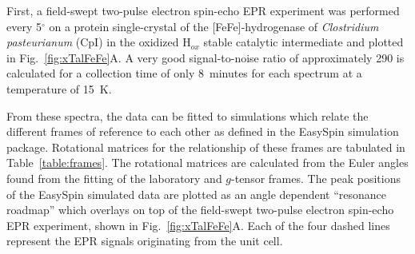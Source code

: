 First, a field-swept two-pulse electron spin-echo EPR experiment was performed every 5$^{\circ}$ on a protein single-crystal of the [FeFe]-hydrogenase of \textit{Clostridium pasteurianum} (CpI) in the oxidized H$_{ox}$ stable catalytic intermediate and plotted in Fig.~\ref{fig:xTalFeFe}A. A very good signal-to-noise ratio of approximately 290 is calculated for a collection time of only 8~minutes for each spectrum at a temperature of 15~K. 

From these spectra, the data can be fitted to simulations which relate the different frames of reference to each other as defined in the EasySpin simulation package. Rotational matrices for the relationship of these frames are tabulated in Table~\ref{table:frames}. The rotational matrices are calculated from the Euler angles found from the fitting of the laboratory and $g$-tensor frames. The peak positions of the EasySpin simulated data are plotted as an angle dependent ``resonance roadmap'' which overlays on top of the field-swept two-pulse electron spin-echo EPR experiment, shown in Fig.~\ref{fig:xTalFeFe}A. Each of the four dashed lines represent the EPR signals originating from the unit cell.

